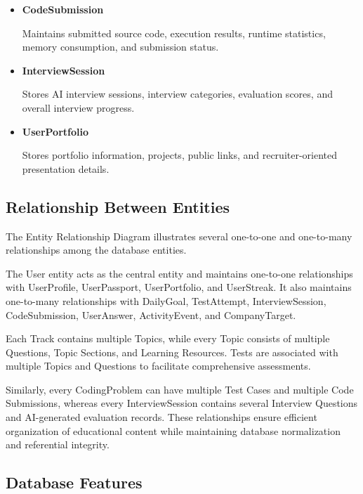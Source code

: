 \begin{itemize}
\item \textbf{CodeSubmission}

Maintains submitted source code, execution results, runtime statistics, memory consumption, and submission status.

\vspace{0.1cm}

\item \textbf{InterviewSession}

Stores AI interview sessions, interview categories, evaluation scores, and overall interview progress.

\vspace{0.1cm}

\item \textbf{UserPortfolio}

Stores portfolio information, projects, public links, and recruiter-oriented presentation details.

\end{itemize}

\subsection{Relationship Between Entities}

The Entity Relationship Diagram illustrates several one-to-one and one-to-many relationships among the database entities.

The User entity acts as the central entity and maintains one-to-one relationships with UserProfile, UserPassport, UserPortfolio, and UserStreak. It also maintains one-to-many relationships with DailyGoal, TestAttempt, InterviewSession, CodeSubmission, UserAnswer, ActivityEvent, and CompanyTarget.

Each Track contains multiple Topics, while every Topic consists of multiple Questions, Topic Sections, and Learning Resources. Tests are associated with multiple Topics and Questions to facilitate comprehensive assessments.

Similarly, every CodingProblem can have multiple Test Cases and multiple Code Submissions, whereas every InterviewSession contains several Interview Questions and AI-generated evaluation records. These relationships ensure efficient organization of educational content while maintaining database normalization and referential integrity.

\subsection{Database Features}

